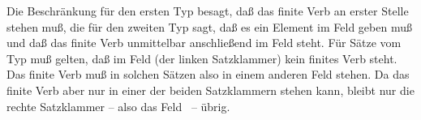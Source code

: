\ex\label{v2-clause-type}  \impl {}
\ex\label{subord-clause-types}  \impl {}
\zl
Die Beschränkung für den ersten Typ besagt, daß das finite Verb an erster Stelle stehen muß,
die für den zweiten Typ sagt, daß es ein Element im Feld  geben muß und daß das
finite Verb unmittelbar anschließend im Feld  steht. Für Sätze vom Typ
 muß gelten, daß im Feld  (der linken Satzklammer) kein finites
Verb steht. Das finite Verb muß in solchen Sätzen also in einem anderen Feld stehen. Da das
finite Verb aber nur in einer der beiden Satzklammern stehen kann, bleibt nur die rechte Satzklammer
-- also das Feld~ -- übrig.

